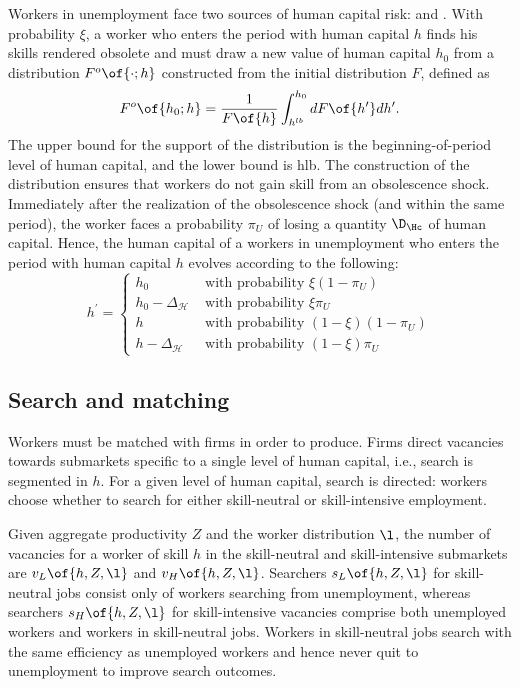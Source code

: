 \documentclass[12pt]{article}
\newcommand{\highlightB}[1]{{\emph{\color{MyBlue}{#1}}}}
\theoremstyle{definition}
\begin{document}
Workers in unemployment face two sources of human capital risk: \highlightB{obsolescence} and \highlightB{gradual depreciation}. With probability $\xi$, a worker who enters the period with human capital $h$ finds his skills rendered obsolete and must draw a new value of human capital $h_0$ from a distribution $F^{o}\of{\cdot; h}$ constructed from the initial distribution $F$, defined as 
\begin{equation}
    \label{6}
    F^{o}\of{h_0; h} = \frac{1}{F\of{h}} \int_{h^{lb}}^{h_0} d F\of{h^{\prime}} d h^{\prime}. 
\end{equation}
The upper bound for the support of the distribution is the beginning-of-period level of human capital, and the lower bound is hlb. The construction of the distribution  ensures that workers do not gain skill from an obsolescence shock. Immediately after the realization of the obsolescence shock (and within the same period), the worker faces a probability $\pi_U$ of losing a quantity $\D_\Hc$ of human capital. Hence, the human  capital of a workers in unemployment who enters the period with human capital $h$ evolves according to the following:
\begin{equation}
    \label{7}
    h^{\prime}= \begin{cases}h_0 & \text { with probability } \xi\left(1-\pi_U\right) \\ h_0-\Delta_{\mathcal{H}} & \text { with probability } \xi \pi_U \\ h & \text { with probability }(1-\xi)\left(1-\pi_U\right) \\ h-\Delta_{\mathcal{H}} & \text { with probability }(1-\xi) \pi_U\end{cases}
\end{equation}

\subsection{Search and matching}

Workers must be matched with firms in order to produce. Firms direct vacancies towards submarkets specific to a single level of human capital, i.e., search is segmented in $h$. For a given level of human capital, search is directed: workers choose whether to search for either skill-neutral or skill-intensive employment. 

Given aggregate productivity $Z$ and the worker distribution $\l$, the number of vacancies for a worker of skill $h$ in the skill-neutral and skill-intensive submarkets are $v_L\of{h, Z, \l}$ and $v_H\of{h, Z, \l}$. Searchers $s_L\of{h, Z, \l}$ for skill-neutral jobs consist only of workers searching from unemployment, whereas searchers $s_H\of{h, Z, \l}$ for skill-intensive vacancies comprise both unemployed workers and workers in skill-neutral jobs. Workers in skill-neutral jobs search with the same efficiency as unemployed workers and hence never quit to unemployment to improve search outcomes.
\end{document}
